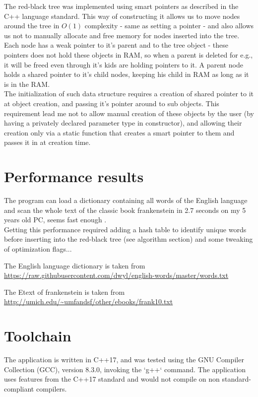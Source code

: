 \documentclass[a4paper]{article}
\begin{document}
The red-black tree was implemented using smart pointers as described in the C++ language standard. This way of constructing it allows us to move nodes around the tree in $O(1)$ complexity - same as setting a pointer - and also allows us not to manually allocate and free memory for nodes inserted into the tree. Each node has a weak pointer to it's parent and to the tree object - these pointers does not hold these objects in RAM, so when a parent is deleted for e.g., it will be freed even through it's kids are holding pointers to it. A parent node holds a shared pointer to it's child nodes, keeping his child in RAM as long as it is in the RAM.\\
The initialization of such data structure requires a creation of shared pointer to it at object creation, and passing it's pointer around to sub objects. This requirement lead me not to allow manual creation of these objects by the user (by having a privately declared parameter type in constructor), and allowing their creation only via a static function that creates a smart pointer to them and passes it in at creation time.

\section{Performance results}

The program can load a dictionary containing all words of the English language and scan the whole text of the classic book frankenstein in 2.7 seconds on my 5 years old PC, seems fast enough \smiley{}.\\

Getting this performance required adding a hash table to identify unique words before inserting into the red-black tree (see algorithm section) and some tweaking of optimization flags...

The English language dictionary is taken from\\
\url{https://raw.githubusercontent.com/dwyl/english-words/master/words.txt}

The Etext of frankenstein is taken from\\
\url{http://umich.edu/~umfandsf/other/ebooks/frank10.txt}

\section{Toolchain}

The application is written in C++17, and was tested using the GNU Compiler Collection (GCC), version 8.3.0, invoking the `g++` command. The application uses features from the C++17 standard and would not compile on non standard-compliant compilers.\\
\end{document}
